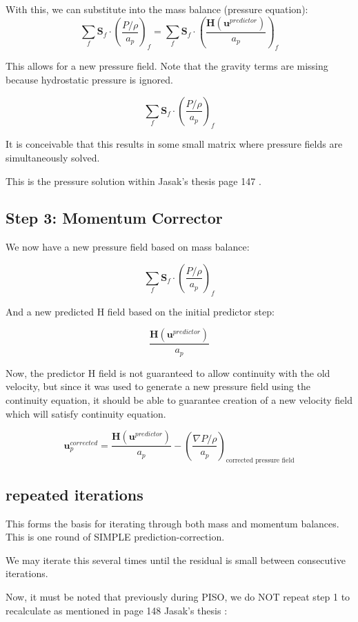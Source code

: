 \documentclass[masters]{ucbthesis}
\renewcommand{\_}{\kern-1.5pt\textunderscore\kern-1.5pt}
\begin{document}
With this, we can substitute into the mass balance (pressure equation):
$$
\sum_f \textbf{S}_f \cdot
\left( 
	\frac{P/\rho}{a_p}
\right)_f
=
\sum_f \textbf{S}_f \cdot
\left( 
	\frac{\textbf{H}(\textbf{u}^{predictor})}{a_p}
\right)_f
$$

This allows for a new pressure field. Note that the gravity terms are missing 
because hydrostatic pressure is ignored.

$$
\sum_f \textbf{S}_f \cdot
\left( 
	\frac{P/\rho}{a_p}
\right)_f
$$

It is conceivable that this results in some small matrix where 
pressure fields are simultaneously solved.

This is the pressure solution within Jasak's thesis page 
147 \citep{jasak1996error}.

\subsection{Step 3: Momentum Corrector}


We now have a new pressure field based on mass balance:

$$
\sum_f \textbf{S}_f \cdot
\left( 
	\frac{P/\rho}{a_p}
\right)_f
$$

And a new predicted H field based on the initial predictor step:

$$
\frac{\textbf{H}(\textbf{u}^{predictor})}{a_p}
$$

Now, the predictor H field is not guaranteed to allow continuity with 
the old velocity, but since it was used to generate a new pressure 
field using the continuity equation, it should be able to guarantee 
creation of a new velocity field which will satisfy continuity equation.


\begin{equation}
	\textbf{u}_p^{corrected} = \frac{\textbf{H}(\textbf{u}^{predictor})}{a_p}
	- \left(\frac{\nabla P/\rho}{a_p}\right)_\text{corrected pressure field}
\end{equation}

\subsection{repeated iterations}
This forms the basis for iterating through both mass and momentum balances.
This is one round of SIMPLE prediction-correction. 

We may iterate this several times until the residual is small between 
consecutive iterations. 

Now, it must be noted that previously during PISO, we do NOT repeat step 1 
to recalculate as mentioned in page 148 Jasak's thesis \cite{jasak1996error}:
\end{document}

